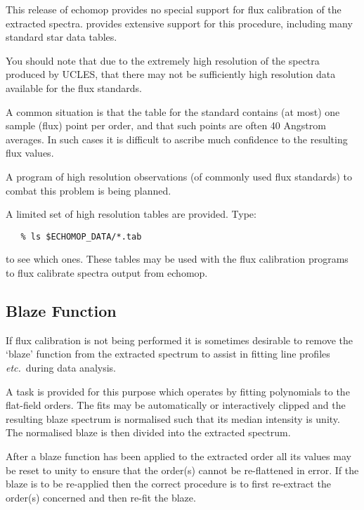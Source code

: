 This release of {\sc echomop} provides no special support for flux
calibration of the extracted spectra.
 provides extensive support for this procedure,
including many standard star data tables.

You should note that due to the extremely high resolution of the
spectra produced by UCLES, that there may not be sufficiently
high resolution data available for the flux standards.

A common situation is that the  table for the
standard contains (at most) one sample (flux) point per order, and that
such points are often 40 Angstrom averages. In such cases it is difficult
to ascribe much confidence to the resulting flux values.

A program of high resolution observations (of commonly used flux
standards) to combat this problem is being planned.

A limited set of high resolution tables are provided. Type:

\begin{verbatim}
   % ls $ECHOMOP_DATA/*.tab
\end{verbatim}

to see which ones. These tables may be used with the
 flux calibration programs
to flux calibrate spectra output from {\sc echomop}.


\subsection{Blaze Function}

If flux calibration is not being performed it is sometimes desirable
to remove the `blaze' function from the extracted spectrum to assist
in fitting line profiles {\it etc.}\ during data analysis.

A task is provided for this purpose which operates by fitting
polynomials to the flat-field orders. The fits may be automatically
or interactively clipped and the resulting blaze spectrum is
normalised such that its median intensity is unity. The normalised
blaze is then divided into the extracted spectrum.

After a blaze function has been applied to the extracted order all
its values may be reset to unity to ensure that the order(s) cannot
be re-flattened in error. If the blaze is to be
re-applied then the correct procedure is to first re-extract the
order(s) concerned and then re-fit the blaze.


